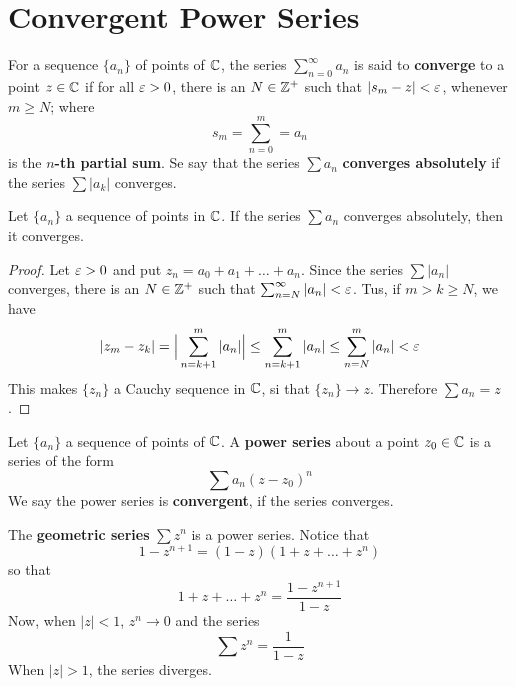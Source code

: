 \section{Convergent Power Series}

\begin{definition}
    For a sequence $\{a_n\}$ of points of $\mathbb{C}$, the series
    $\sum_{n=0}^\infty{a_n}$ is said to \textbf{converge} to a point $z \in \mathbb{C}$
    if for all $\varepsilon>0$, there is an  $N \in \mathbb{Z}^+$ such that  $|s_m-z|<\varepsilon$,
    whenever $m \geq N$; where
    \begin{equation*}
        s_m=\sum_{n=0}^m={a_n}
    \end{equation*}
    is the \textbf{$n$-th partial sum}. Se say that the series $\sum{a_n}$
    \textbf{converges absolutely} if the series $\sum{|a_k|}$ converges.
\end{definition}

\begin{lemma}\label{3.1.1}
    Let $\{a_n\}$ a sequence of points in $\mathbb{C}$. If the series  $\sum{a_n}$
    converges absolutely, then it converges.
\end{lemma}
\begin{proof}
    Let $\varepsilon>0$ and put  $z_n=a_0+a_1+\dots+a_n$. Since the series $\sum{|a_n|}$
    converges, there is an $N \in \mathbb{Z}^+$ such that
    $\sum_{n=N}^\infty{|a_n|}<\varepsilon$. Tus, if $m>k \geq N$, we have
    \begin{equation*}
        |z_m-z_k|=\Big{|} \sum_{n=k+1}^m{|a_n|} \Big{|} \leq \sum_{n=k+1}^m{|a_n|}
        \leq \sum_{n=N}^m{|a_n|}<\varepsilon
    \end{equation*}
    This makes $\{z_n\}$ a Cauchy sequence in $\mathbb{C}$, si that  $\{z_n\}
    \xrightarrow{} z$. Therefore $\sum{a_n}=z$.
\end{proof}

\begin{definition}
    Let $\{a_n\}$ a sequence of points of $\mathbb{C}$. A  \textbf{power series} about a
    point $z_0 \in \mathbb{C}$ is a series of the form
    \begin{equation*}
        \sum{a_n(z-z_0)^n}
    \end{equation*}
    We say the power series is \textbf{convergent}, if the series converges.
\end{definition}

\begin{example}\label{example_3.1}
    The \textbf{geometric series} $\sum{z^n}$ is a power series. Notice that
    \begin{equation*}
        1-z^{n+1}=(1-z)(1+z+\dots+z^n)
    \end{equation*}
    so that
    \begin{equation*}
        1+z+\dots+z^n=\frac{1-z^{n+1}}{1-z}
    \end{equation*}
    Now, when $|z|<1$,  $z^n \xrightarrow{} 0$ and the series
    \begin{equation*}
        \sum{z^n}=\frac{1}{1-z}
    \end{equation*}
    When $|z|>1$, the series diverges.
\end{example}

